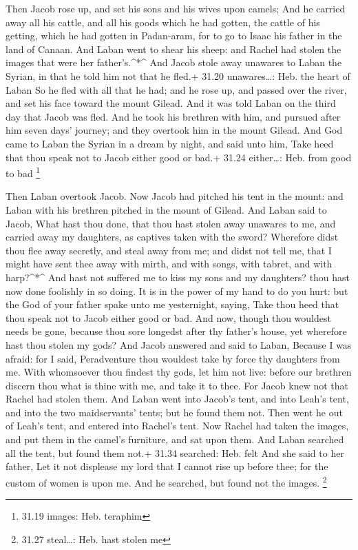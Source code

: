  Then Jacob rose up, and set his sons and his wives upon
camels;  And he carried away all his cattle, and all his
goods which he had gotten, the cattle of his getting, which he had
gotten in Padan-aram, for to go to Isaac his father in the land of
Canaan.  And Laban went to shear his sheep: and Rachel had
stolen the images that were her father's.\^{}*\^{}  And
Jacob stole away unawares to Laban the Syrian, in that he told him not
that he fled.+ 31.20 unawares\ldots: Heb. the heart of Laban
 So he fled with all that he had; and he rose up, and
passed over the river, and set his face toward the mount Gilead.
 And it was told Laban on the third day that Jacob was
fled.  And he took his brethren with him, and pursued after
him seven days' journey; and they overtook him in the mount Gilead.
 And God came to Laban the Syrian in a dream by night, and
said unto him, Take heed that thou speak not to Jacob either good or
bad.+ 31.24 either\ldots: Heb. from good to bad \footnote{31.19 images:
  Heb. teraphim}

 Then Laban overtook Jacob. Now Jacob had pitched his tent
in the mount: and Laban with his brethren pitched in the mount of
Gilead.  And Laban said to Jacob, What hast thou done, that
thou hast stolen away unawares to me, and carried away my daughters, as
captives taken with the sword?  Wherefore didst thou flee
away secretly, and steal away from me; and didst not tell me, that I
might have sent thee away with mirth, and with songs, with tabret, and
with harp?\^{}*\^{}  And hast not suffered me to kiss my
sons and my daughters? thou hast now done foolishly in so doing.
 It is in the power of my hand to do you hurt: but the God
of your father spake unto me yesternight, saying, Take thou heed that
thou speak not to Jacob either good or bad.  And now,
though thou wouldest needs be gone, because thou sore longedst after thy
father's house, yet wherefore hast thou stolen my gods? 
And Jacob answered and said to Laban, Because I was afraid: for I said,
Peradventure thou wouldest take by force thy daughters from me.
 With whomsoever thou findest thy gods, let him not live:
before our brethren discern thou what is thine with me, and take it to
thee. For Jacob knew not that Rachel had stolen them.  And
Laban went into Jacob's tent, and into Leah's tent, and into the two
maidservants' tents; but he found them not. Then went he out of Leah's
tent, and entered into Rachel's tent.  Now Rachel had taken
the images, and put them in the camel's furniture, and sat upon them.
And Laban searched all the tent, but found them not.+ 31.34 searched:
Heb. felt  And she said to her father, Let it not displease
my lord that I cannot rise up before thee; for the custom of women is
upon me. And he searched, but found not the images. \footnote{31.27
  steal\ldots: Heb. hast stolen me}

